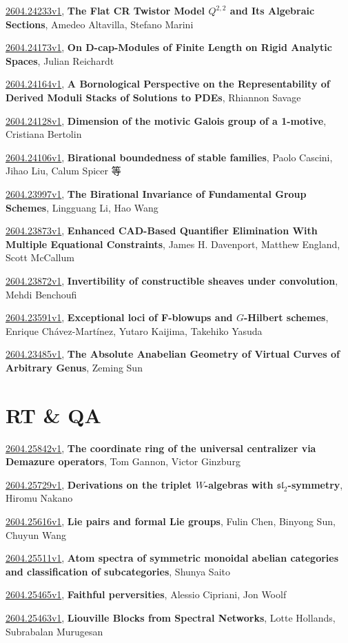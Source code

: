 \documentclass[9pt, a4paper]{article}
\theoremstyle{plain}
\theoremstyle{definition}
\theoremstyle{remark}
\newcommand{\arxiv}[3]{\href{https://arxiv.org/abs/#1}{#1}, \textbf{\textcolor{arxivblue}{#2}}, #3}
\begin{document}
\arxiv{2604.24233v1}{The Flat CR Twistor Model $Q^{2,2}$ and Its Algebraic Sections}{Amedeo Altavilla, Stefano Marini}

\arxiv{2604.24173v1}{On D-cap-Modules of Finite Length on Rigid Analytic Spaces}{Julian Reichardt}

\arxiv{2604.24164v1}{A Bornological Perspective on the Representability of Derived Moduli Stacks of Solutions to PDEs}{Rhiannon Savage}

\arxiv{2604.24128v1}{Dimension of the motivic Galois group of a 1-motive}{Cristiana Bertolin}

\arxiv{2604.24106v1}{Birational boundedness of stable families}{Paolo Cascini, Jihao Liu, Calum Spicer 等}

\arxiv{2604.23997v1}{The Birational Invariance of Fundamental Group Schemes}{Lingguang Li, Hao Wang}

\arxiv{2604.23873v1}{Enhanced CAD-Based Quantifier Elimination With Multiple Equational Constraints}{James H. Davenport, Matthew England, Scott McCallum}

\arxiv{2604.23872v1}{Invertibility of constructible sheaves under convolution}{Mehdi Benchoufi}

\arxiv{2604.23591v1}{Exceptional loci of F-blowups and $G$-Hilbert schemes}{Enrique Chávez-Martínez, Yutaro Kaijima, Takehiko Yasuda}

\arxiv{2604.23485v1}{The Absolute Anabelian Geometry of Virtual Curves of Arbitrary Genus}{Zeming Sun}


\section{RT \& QA}
\arxiv{2604.25842v1}{The coordinate ring of the universal centralizer via Demazure operators}{Tom Gannon, Victor Ginzburg}

\arxiv{2604.25729v1}{Derivations on the triplet $W$-algebras with $\mathfrak{sl}_2$-symmetry}{Hiromu Nakano}

\arxiv{2604.25616v1}{Lie pairs and formal Lie groups}{Fulin Chen, Binyong Sun, Chuyun Wang}

\arxiv{2604.25511v1}{Atom spectra of symmetric monoidal abelian categories and classification of subcategories}{Shunya Saito}

\arxiv{2604.25465v1}{Faithful perversities}{Alessio Cipriani, Jon Woolf}

\arxiv{2604.25463v1}{Liouville Blocks from Spectral Networks}{Lotte Hollands, Subrabalan Murugesan}
\end{document}
